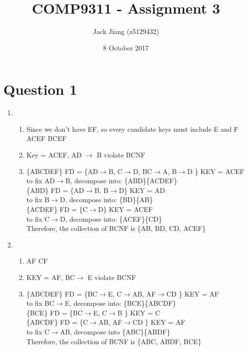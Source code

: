 \documentclass[11pt, a4paper]{article}
\begin{document}
\title{COMP9311 - Assignment 3}
\author{Jack Jiang (z5129432)}
\date{ 8 October 2017 }
\maketitle
\graphicspath{{Graphics/}}


\section*{Question 1}
\renewcommand{\labelenumi}{\roman{enumi}. }
\begin{enumerate}
    \item    
        \begin{enumerate}
            \item 
                Since we don't have EF, so every candidate keys must include E and F
                ACEF
                BCEF
            \item
                Key = ACEF, AD $\to$ B violate BCNF
            \item 
                \{ABCDEF\} FD = \{AD$\to$B, C$\to$D, BC$\to$A, B$\to$D \} KEY = ACEF\\
                to fix AD$\to$B, decompose into: \{ABD\}\{ACDEF\}\\
                \{ABD\} FD = \{AD$\to$B, B$\to$D\} KEY = AD\\
                to fix B$\to$D, decompose into: \{BD\}\{AB\}\\
                \{ACDEF\} FD = \{C$\to$D\} KEY = ACEF\\
                to fix C$\to$D, decompose into: \{ACEF\}\{CD\}\\
                Therefore, the collection of BCNF is \{AB, BD, CD, ACEF\}
        \end{enumerate}

    \item    
        \begin{enumerate}
            \item 
                AF
                CF
            \item
                KEY = AF, BC$\to$ E violate BCNF
            \item 
            \{ABCDEF\} FD = \{BC$\to$E, C$\to$AB, AF$\to$CD \} KEY = AF\\
            to fix BC$\to$E, decompose into: \{BCE\}\{ABCDF\}\\
            \{BCE\} FD = \{BC$\to$E, C$\to$B \} KEY = C\\
            \{ABCDF\} FD = \{C$\to$AB, AF$\to$CD \} KEY = AF\\
            to fix C$\to$AB, decompose into \{ABC\}\{ABDF\}\\
            Therefore, the collection of BCNF is \{ABC, ABDF, BCE\}
        \end{enumerate}


\end{enumerate}
\end{document}
